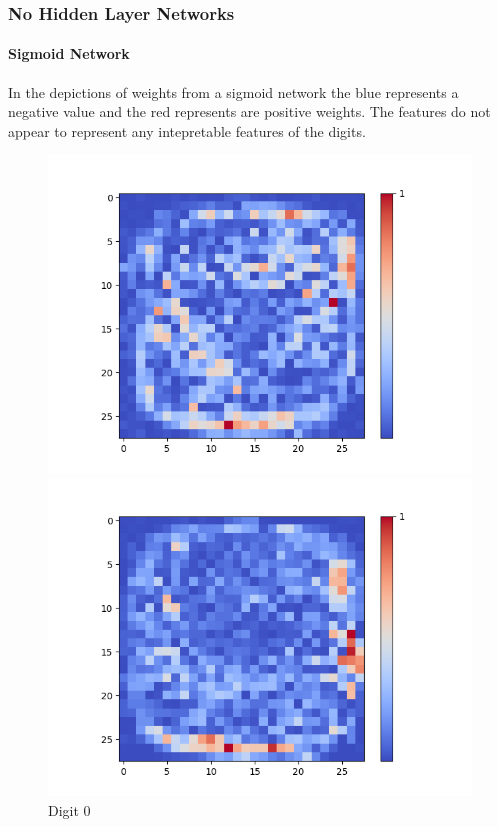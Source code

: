 \subsubsection{No Hidden Layer Networks}


\paragraph{Sigmoid Network}
In the depictions of weights from a sigmoid network the blue represents a negative value and the red represents are positive weights. The features do not appear to represent any intepretable features of the digits.

\begin{figure}[H]
	\captionsetup{labelformat=empty}
	\centering
	\begin{minipage}[b]{0.19\textwidth}
		\includegraphics[width=\textwidth]{Sigmoid(NO-Hidden)/Layer0-Neuron-0.png}
		\caption{Digit 0}
	\end{minipage}
	\begin{minipage}[b]{0.19\textwidth}
		\includegraphics[width=\textwidth]{Sigmoid(NO-Hidden)/Layer0-Neuron-2.png}

\end{minipage}
\end{figure}
